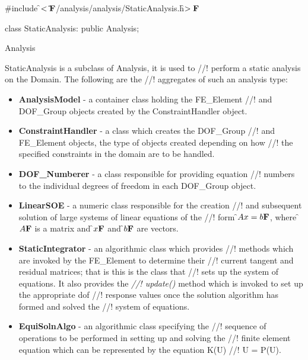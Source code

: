 
\indent \#include \f$<\tilde{ }{\bf F}$/analysis/analysis/StaticAnalysis.h\f$>{\bf F}$

\indent class StaticAnalysis: public Analysis;

\indent Analysis
\indent{}

\indent StaticAnalysis is a subclass of Analysis, it is used to
//! perform a static analysis on the Domain. The following are the
//! aggregates of such an analysis type: 
\begin{itemize}
\item {\bf AnalysisModel} - a container class holding the FE\_Element
//! and DOF\_Group objects created by the ConstraintHandler object. 
\item {\bf ConstraintHandler} - a class which creates the DOF\_Group
//! and FE\_Element objects, the type of objects created depending on how
//! the specified constraints in the domain are to be handled. 
\item {\bf DOF\_Numberer} - a class responsible for providing equation
//! numbers to the individual degrees of freedom in each DOF\_Group object.
\item {\bf LinearSOE} - a numeric class responsible for the creation
//! and subsequent solution of large systems of linear equations of the
//! form \f$Ax = b{\bf F}$, where \f$A{\bf F}$ is a matrix and \f$x{\bf F}$ and \f$b{\bf F}$ are vectors.
\item {\bf StaticIntegrator} - an algorithmic class which provides
//! methods which are invoked by the FE\_Element to determine their
//! current tangent and residual matrices; that is this is the class that
//! sets up the system of equations.  It also provides the {\em
//! update()} method which is invoked to set up the appropriate dof
//! response values once the solution algorithm has formed and solved the
//! system of equations.
\item {\bf EquiSolnAlgo} - an algorithmic class specifying the
//! sequence of operations to be performed in setting up and solving the
//! finite element equation which can be represented by the equation K(U)
//! U = P(U). 
\end{itemize}

